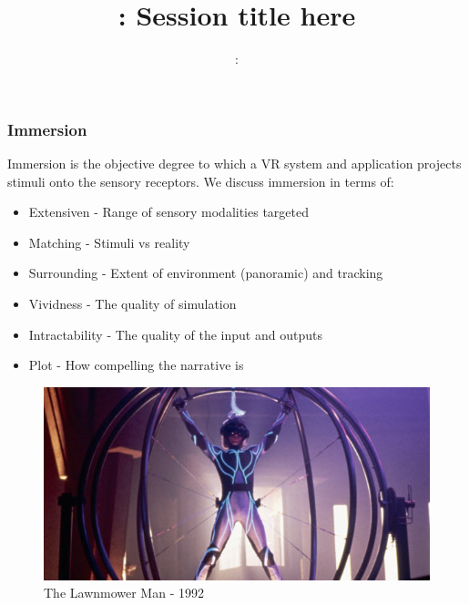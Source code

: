 \usepackage{../../beamerthemeFalmouthGamesAcademy}
\usepackage{multimedia}
\graphicspath{ {../../} }


\usepackage[normalem]{ulem}
\usepackage{wasysym}
\usepackage{gensymb}
\usepackage{pdfpages}

\usetikzlibrary{arrows,automata}




\title{\sessionnumber: Session title here}
\subtitle{\modulecode: \moduletitle}

\frame{\titlepage} 


\begin{frame}
	\frametitle{Immersion}
	Immersion is the objective degree to which a VR system and application projects stimuli onto the sensory receptors. We discuss immersion in terms of:

	\begin{itemize}
		\item Extensiven - Range of sensory modalities targeted 
		\item Matching - Stimuli vs reality
		\item Surrounding - Extent of environment (panoramic) and tracking
		\item Vividness - The quality of simulation
		\item Intractability - The quality of the input and outputs
		\item Plot - How compelling the narrative is
	\end{itemize}
\end{frame}

\begin{frame}
	\begin{figure}
		\includegraphics[scale=.6]{assets/mower} 
		\caption{The Lawnmower Man - 1992}
	\end{figure}
\end{frame}


